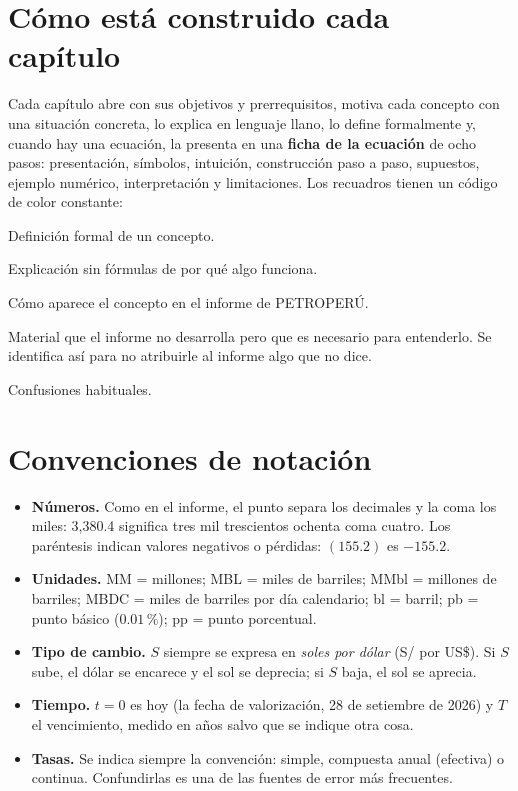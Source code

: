 \section*{Cómo está construido cada capítulo}

Cada capítulo abre con sus objetivos y prerrequisitos, motiva cada concepto con una situación concreta, lo explica en lenguaje llano, lo define formalmente y, cuando hay una ecuación, la presenta en una \textbf{ficha de la ecuación} de ocho pasos: presentación, símbolos, intuición, construcción paso a paso, supuestos, ejemplo numérico, interpretación y limitaciones. Los recuadros tienen un código de color constante:

\begin{definicion}[término]Definición formal de un concepto.\end{definicion}
\begin{intuicion}Explicación sin fórmulas de por qué algo funciona.\end{intuicion}
\begin{informe}Cómo aparece el concepto en el informe de PETROPERÚ.\end{informe}
\begin{adicional}Material que el informe no desarrolla pero que es necesario para entenderlo. Se identifica así para no atribuirle al informe algo que no dice.\end{adicional}
\begin{cuidado}Confusiones habituales.\end{cuidado}

\section*{Convenciones de notación}

\begin{itemize}
\item \textbf{Números.} Como en el informe, el punto separa los decimales y la coma los miles: 3,380.4 significa tres mil trescientos ochenta coma cuatro. Los paréntesis indican valores negativos o pérdidas: $(155.2)$ es $-155.2$.
\item \textbf{Unidades.} MM = millones; MBL = miles de barriles; MMbl = millones de barriles; MBDC = miles de barriles por día calendario; bl = barril; pb = punto básico ($0.01\,\%$); pp = punto porcentual.
\item \textbf{Tipo de cambio.} $S$ siempre se expresa en \emph{soles por dólar} (S/ por US\$). Si $S$ sube, el dólar se encarece y el sol se deprecia; si $S$ baja, el sol se aprecia.
\item \textbf{Tiempo.} $t=0$ es hoy (la fecha de valorización, 28 de setiembre de 2026) y $T$ el vencimiento, medido en años salvo que se indique otra cosa.
\item \textbf{Tasas.} Se indica siempre la convención: simple, compuesta anual (efectiva) o continua. Confundirlas es una de las fuentes de error más frecuentes.
\end{itemize}

